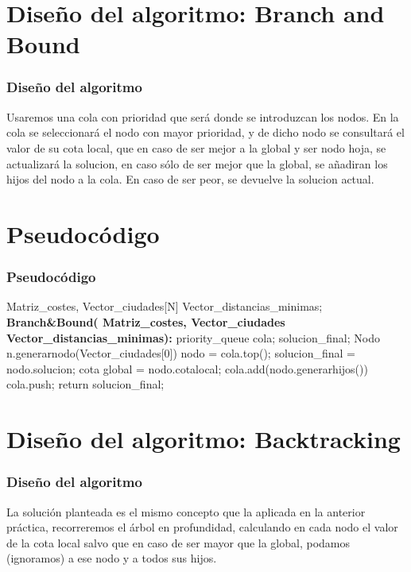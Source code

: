 \documentclass{beamer}
\begin{document}
\section{Diseño del algoritmo: Branch and Bound} 
\begin{frame}
	\frametitle{Diseño del algoritmo}
	


Usaremos una cola con prioridad que será donde se introduzcan los nodos.
En la cola se seleccionará el nodo con mayor prioridad, y de dicho nodo se consultará el valor de su cota local, que en caso de ser mejor a la global  y ser nodo hoja, se actualizará la solucion, en caso sólo de ser mejor que la global, se añadiran los hijos del nodo a la cola. En caso de ser peor, se devuelve la solucion actual.


	
\end{frame}	
	\section{Pseudocódigo}
	
	\begin{frame}
		\frametitle{Pseudocódigo}
		\footnotesize{	
			\begin{algorithmic}				
				\Require Matriz\_costes, Vector\_ciudades[N] Vector\_distancias\_minimas; 
				\State \textbf{Branch\&Bound( Matriz\_costes, Vector\_ciudades Vector\_distancias\_minimas):}
				\State priority\_queue cola;
				\State solucion\_final;
				\State	 Nodo n.generarnodo(Vector\_ciudades[0])
							\State nodo = cola.top();
							\State solucion\_final = nodo.solucion;
							\State cota global = nodo.cotalocal;
							\EndIf
							\State cola.add(nodo.generarhijos())
							\State cola.push;
							\Else
							\State return solucion\_final;
							
							\EndIf
							
									\EndWhile
							
				
				
			\end{algorithmic}	
		}
	\end{frame}
	
\section{Diseño del algoritmo: Backtracking} 
\begin{frame}
	\frametitle{Diseño del algoritmo}
	
	La solución planteada es el mismo concepto que la aplicada en la anterior práctica, recorreremos el árbol en profundidad, calculando en cada nodo el valor de la cota local salvo que en caso de ser mayor que la global, podamos (ignoramos) a ese nodo y a todos sus hijos.
	
	
\end{frame}	
\end{document}
